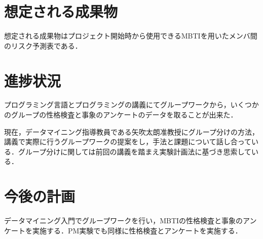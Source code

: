 \documentclass[uplatex,twocolumn,dvipdfmx]{jsarticle}
\begin{document}
\section{想定される成果物}
想定される成果物はプロジェクト開始時から使用できるMBTIを用いたメンバ間のリスク予測表である．

\section{進捗状況}
プログラミング言語とプログラミングの講義にてグループワークから，いくつかのグループの性格検査と事象のアンケートのデータを取ることが出来た．

現在，データマイニング指導教員である矢吹太朗准教授にグループ分けの方法，講義で実際に行うグループワークの提案をし，手法と課題について話し合っている．グループ分けに関しては前回の講義を踏まえ実験計画法に基づき思索している．

\section{今後の計画}
データマイニング入門でグループワークを行い，MBTIの性格検査と事象のアンケートを実施する．PM実験でも同様に性格検査とアンケートを実施する．


\nocite{110003745117}\

\end{document}
